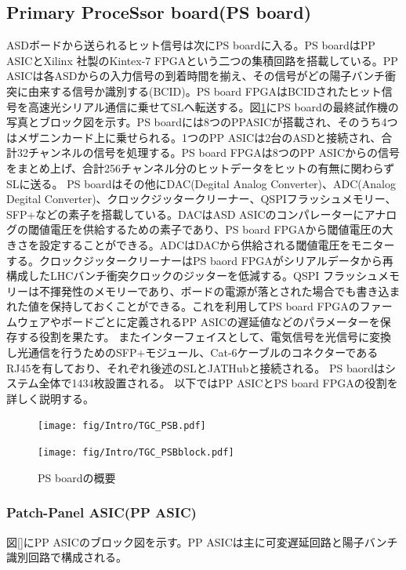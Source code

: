     \subsection*{Primary ProceSsor board(PS board)}
ASDボードから送られるヒット信号は次にPS boardに入る。PS boardはPP ASICとXilinx 社製のKintex-7 FPGAという二つの集積回路を搭載している。PP ASICは各ASDからの入力信号の到着時間を揃え、その信号がどの陽子バンチ衝突に由来する信号か識別する(BCID)。PS board FPGAはBCIDされたヒット信号を高速光シリアル通信に乗せてSLへ転送する。図\ref{TGC_PSB}にPS boardの最終試作機の写真とブロック図を示す。PS boardには8つのPPASICが搭載され、そのうち4つはメザニンカード上に乗せられる。1つのPP ASICは2台のASDと接続され、合計32チャンネルの信号を処理する。PS board FPGAは8つのPP ASICからの信号をまとめ上げ、合計256チャンネル分のヒットデータをヒットの有無に関わらずSLに送る。
PS boardはその他にDAC(Degital Analog Converter)、ADC(Analog Degital Converter)、クロックジッタークリーナー、QSPIフラッシュメモリー、SFP+などの素子を搭載している。DACはASD ASICのコンパレーターにアナログの閾値電圧を供給するための素子であり、PS board FPGAから閾値電圧の大きさを設定することができる。ADCはDACから供給される閾値電圧をモニターする。クロックジッタークリーナーはPS baord FPGAがシリアルデータから再構成したLHCバンチ衝突クロックのジッターを低減する。QSPI フラッシュメモリーは不揮発性のメモリーであり、ボードの電源が落とされた場合でも書き込まれた値を保持しておくことができる。これを利用してPS board FPGAのファームウェアやボードごとに定義されるPP ASICの遅延値などのパラメーターを保存する役割を果たす。
またインターフェイスとして、電気信号を光信号に変換し光通信を行うためのSFP+モジュール、Cat-6ケーブルのコネクターであるRJ45を有しており、それぞれ後述のSLとJATHubと接続される。
PS baordはシステム全体で1434枚設置される。
以下ではPP ASICとPS board FPGAの役割を詳しく説明する。

\begin{figure}
\begin{minipage}[b]{.5\linewidth}
\centering
\texttt{[image: fig/Intro/TGC\_PSB.pdf]}
\end{minipage}%
\begin{minipage}[b]{.5\linewidth}
\centering
\texttt{[image: fig/Intro/TGC\_PSBblock.pdf]}
\end{minipage}%
\caption[PS boardの概要]{PS boardの概要}
\label{TGC_PSB}
\end{figure}

\subsubsection*{Patch-Panel ASIC(PP ASIC)}
図\ref{}にPP ASICのブロック図を示す。PP ASICは主に可変遅延回路と陽子バンチ識別回路で構成される。

